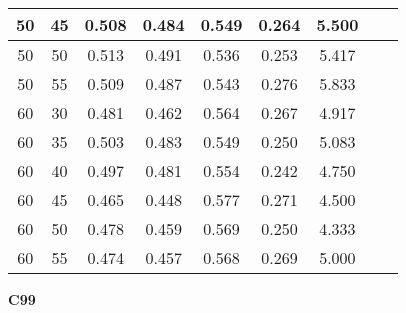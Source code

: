 \documentclass{article}
\begin{document}
\begin{longtable}[c]{|c|c|c|c|c|c|c|c|c|}
 50 & 45 & 0.508 & 0.484 & 0.549 & 0.264 & 5.500  \\ \hline 
 50 & 50 & 0.513 & 0.491 & 0.536 & 0.253 & 5.417  \\ \hline 
 50 & 55 & 0.509 & 0.487 & 0.543 & 0.276 & 5.833  \\ \hline 
 60 & 30 & 0.481 & 0.462 & 0.564 & 0.267 & 4.917  \\ \hline 
 60 & 35 & 0.503 & 0.483 & 0.549 & 0.250 & 5.083  \\ \hline 
 60 & 40 & 0.497 & 0.481 & 0.554 & 0.242 & 4.750  \\ \hline 
 60 & 45 & 0.465 & 0.448 & 0.577 & 0.271 & 4.500  \\ \hline 
 60 & 50 & 0.478 & 0.459 & 0.569 & 0.250 & 4.333  \\ \hline 
 60 & 55 & 0.474 & 0.457 & 0.568 & 0.269 & 5.000  \\ \hline 
 \end{longtable} 



 \newpage
{  
\large
\center
	\textbf{C99}  

}
\end{document}
